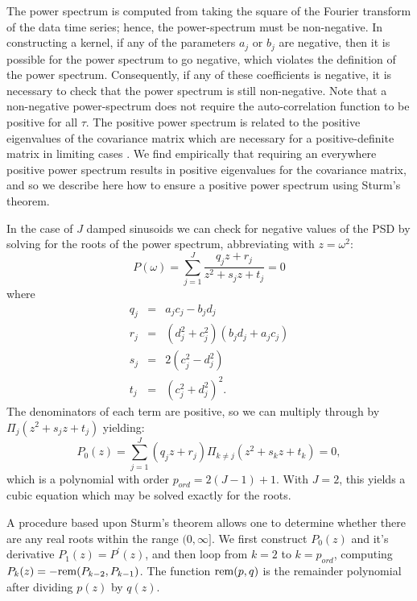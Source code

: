 \documentclass[manuscript, letterpaper]{aastex6}
\begin{document}
The power spectrum is computed from taking the square of the Fourier transform
of the data time series; hence, the power-spectrum must be non-negative.  In
constructing a kernel, if any of the parameters $a_j$ or $b_j$ are negative,
then it is possible for the power spectrum to go negative, which violates the
definition of the power spectrum.
Consequently, if any of these coefficients is negative, it is necessary to
check that the power spectrum is still non-negative.  Note that a non-negative
power-spectrum does not require the auto-correlation
function to be positive for all $\tau$.  The positive power spectrum is
related to the positive eigenvalues of the covariance matrix which are
necessary for a positive-definite matrix in limiting cases
\citep{Messerschmitt:2006}.  We find empirically that requiring an everywhere
positive power spectrum results in positive eigenvalues for the covariance
matrix, and so we describe here how to ensure a positive power spectrum using
Sturm's theorem.

In the case of $J$ damped sinusoids we can check for negative values of the PSD by solving for the
roots of the power spectrum, abbreviating with $z = \omega^2$:
\begin{equation}
P(\omega)=  \sum_{j=1}^J \frac{q_j z + r_j}{z^2+s_jz + t_j} = 0
\end{equation}
where
\begin{eqnarray}
q_j &=& a_jc_j-b_jd_j\\
r_j &=& (d_j^2+c_j^2)(b_jd_j+a_jc_j)\\
s_j &=& 2(c_j^2-d_j^2)\\
t_j &=& (c_j^2+d_j^2)^2.
\end{eqnarray}
The denominators of each term are positive, so we can multiply through by $\Pi_j \left(z^2+s_jz + t_j\right)$ yielding:
\begin{equation}
P_0(z) = \sum_{j=1}^J (q_j z + r_j)\Pi_{k \ne j}\left(z^2+s_kz + t_k\right) = 0,
\end{equation}
which is a polynomial with order $p_{ord}=2(J-1)+1$.  With $J=2$, this yields a cubic equation
which may be solved exactly for the roots.

A procedure based upon Sturm's theorem \citep{Dorrie:1965} allows one to determine whether there are any
real roots within the range $(0,\infty]$. We first construct $P_0(z)$ and it's derivative
$P_1(z) = P^\prime(z)$, and then loop from $k=2$ to $k=p_{ord}$, computing
$P_k(z) = -{\rm rem}(P_{k-2},P_{k-1})$.  The function ${\rm rem}(p,q)$ is the remainder polynomial after dividing $p(z)$ by $q(z)$.
\end{document}
